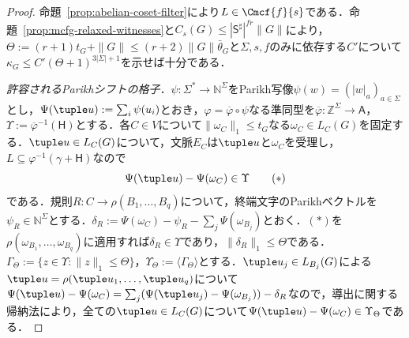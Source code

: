 \begin{proof}
命題~\ref{prop:abelian-coset-filter}により$L\in\Cmcf{f}{s}$である．命題~\ref{prop:mcfg-relaxed-witnesses}と$C_s(G)\le|\mathsf S^\sharp|^{fr}\|G\|$により，$\Theta:=(r+1)t_G+\|G\|\le(r+2)\|G\|\bar\theta_G$と$\Sigma,s,f$のみに依存する$C'$について$\kappa_G\le C'(\Theta+1)^{3|\Sigma|+1}$を示せば十分である．

\emph{許容されるParikhシフトの格子．}$\psi:\Sigma^*\to\mathbb N^\Sigma$をParikh写像$\psi(w)=(|w|_a)_{a\in\Sigma}$とし，$\Psi(\tuple u):=\sum_i\psi(u_i)$とおき，$\varphi=\overline\varphi\circ\psi$なる準同型を$\overline\varphi:\mathbb Z^\Sigma\to\mathsf A$，$\Upsilon:=\overline\varphi^{-1}(\mathsf H)$とする．各$C\in V$について$\|\omega_C\|_1\le t_G$なる$\omega_C\in L_C(G)$を固定する．$\tuple u\in L_C(G)$について，文脈$E_C$は$\tuple u$と$\omega_C$を受理し，$L\subseteq\varphi^{-1}(\gamma+\mathsf H)$なので
\[
 \Psi(\tuple u)-\Psi(\omega_C)\in\Upsilon\tag{$*$}
\]
である．規則$R:C\to\rho(B_1,\ldots,B_q)$について，終端文字のParikhベクトルを$\psi_R\in\mathbb N^\Sigma$とする．$\delta_R:=\Psi(\omega_C)-\psi_R-\sum_j\Psi(\omega_{B_j})$とおく．$(*)$を$\rho(\omega_{B_1},\ldots,\omega_{B_q})$に適用すれば$\delta_R\in\Upsilon$であり，$\|\delta_R\|_1\le \Theta$である．$\Gamma_\Theta:=\{z\in\Upsilon:\|z\|_1\le \Theta\}$，$\Upsilon_\Theta:=\langle\Gamma_\Theta\rangle$とする．$\tuple u_j\in L_{B_j}(G)$による$\tuple u=\rho(\tuple u_1,\ldots,\tuple u_q)$について$\Psi(\tuple u)-\Psi(\omega_C)=\sum_j(\Psi(\tuple u_j)-\Psi(\omega_{B_j}))-\delta_R$なので，導出に関する帰納法により，全ての$\tuple u\in L_C(G)$について$\Psi(\tuple u)-\Psi(\omega_C)\in\Upsilon_\Theta$である．


\end{proof}
